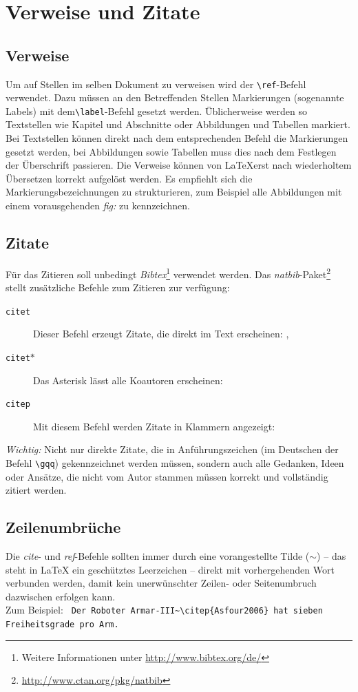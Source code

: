 \documentclass[english,ngerman]{KITreprt}
\begin{document}
\section{Verweise und Zitate}
\subsection{Verweise}
\label{sec:ref}
Um auf Stellen im selben Dokument zu verweisen wird der \lstinline[language={[LaTeX]TeX}]!\ref!-Befehl verwendet.
Dazu m\"ussen an den Betreffenden Stellen Markierungen (sogenannte Labels) mit dem\lstinline[language={[LaTeX]TeX}]!\label!-Befehl gesetzt werden.
\"Ublicherweise werden so Textstellen wie Kapitel und Abschnitte oder Abbildungen und Tabellen markiert.
Bei Textstellen k\"onnen direkt nach dem entsprechenden Befehl die Markierungen gesetzt werden, bei Abbildungen sowie Tabellen muss dies nach dem Festlegen der \"Uberschrift passieren. 
Die Verweise k\"onnen von \LaTeX erst nach wiederholtem \"Ubersetzen korrekt aufgel\"ost werden.
Es empfiehlt sich die Markierungsbezeichnungen zu strukturieren, zum Beispiel alle Abbildungen mit einem vorausgehenden \emph{fig:} zu kennzeichnen.
\subsection{Zitate}
F\"ur das Zitieren soll unbedingt \emph{Bibtex}\footnote{Weitere Informationen unter \url{http://www.bibtex.org/de/}} verwendet werden.
Das \emph{natbib}-Paket\footnote{\url{http://www.ctan.org/pkg/natbib}} stellt zus\"atzliche Befehle zum Zitieren zur verf\"ugung:
\begin{description}
\item[\texttt{citet}] Dieser Befehl erzeugt Zitate, die direkt im Text erscheinen: \citet{Asfour2006}, 
\item[\texttt{citet}$\ast$] Das Asterisk l\"asst alle Koautoren erscheinen: \citet*{Asfour2006}
\item[\texttt{citep}] Mit diesem Befehl werden Zitate in Klammern angezeigt: \citep{Asfour2006}
\end{description}
\emph{Wichtig:} Nicht nur direkte Zitate, die in Anf\"uhrungszeichen (im Deutschen der Befehl \lstinline[language={[LaTeX]TeX}]!\gqq!) gekennzeichnet werden m\"ussen, sondern auch alle Gedanken, Ideen oder Ans\"atze,
die nicht vom Autor stammen m\"ussen korrekt und vollst\"andig zitiert werden.
\subsection{Zeilenumbr\"uche}
Die \emph{cite}- und \emph{ref}-Befehle sollten immer durch eine vorangestellte Tilde ($\sim$) -- das steht in \LaTeX{} ein gesch\"utztes Leerzeichen -- direkt mit vorhergehenden Wort verbunden werden, damit kein unerw\"unschter
Zeilen- oder Seitenumbruch dazwischen erfolgen kann.\\
Zum Beispiel: \lstinline[language={[LaTeX]TeX},morekeywords={citep}]! Der Roboter Armar-III~\citep{Asfour2006} hat sieben Freiheitsgrade pro Arm.!
\end{document}
